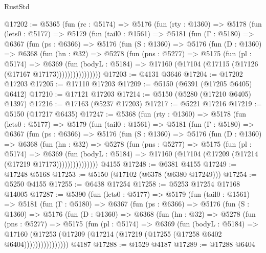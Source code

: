 \begin{lexlean}{RustStd}
\begin{coremodule}
@17202 := @5365
    (fun (rc : @5174) =>
    @5176
      (fun (rty : @1360) =>
      @5178
        (fun (lets0 : @5177) =>
        @5179
          (fun (tail0 : @1561) =>
          @5181
            (fun (Γ : @5180) =>
            @6367
              (fun (ps : @6366) =>
              @5176
                (fun (S : @1360) =>
                @5176
                  (fun (D : @1360) =>
                  @6368
                    (fun (hn : @32) =>
                    @5278
                      (fun (pns : @5277) =>
                      @5175
                        (fun (pl : @5174) =>
                        @6369
                          (fun (bodyL : @5184) =>
                          @17160 (@17104 (@17115 (@17126 (@17167 @17173))))))))))))))))
@17203 := @4131 @3646
@17204 := @17202 @17203
@17205 := @17110 @17203
@17209 := @5150 (@6391 (@17205 @6405) @6412)
@17210 := @17121 @17203
@17214 := @5150 (@5280 (@17210 @6405) @1397)
@17216 := @17163 (@5237 @17203)
@17217 := @5221 @17216
@17219 := @5150 (@17217 @6435)
@17247 := @5368
    (fun (rty : @1360) =>
    @5178
      (fun (lets0 : @5177) =>
      @5179
        (fun (tail0 : @1561) =>
        @5181
          (fun (Γ : @5180) =>
          @6367
            (fun (ps : @6366) =>
            @5176
              (fun (S : @1360) =>
              @5176
                (fun (D : @1360) =>
                @6368
                  (fun (hn : @32) =>
                  @5278
                    (fun (pns : @5277) =>
                    @5175
                      (fun (pl : @5174) =>
                      @6369
                        (fun (bodyL : @5184) =>
                        @17160 (@17104 (@17209 (@17214 (@17219 @17173)))))))))))))))
    @4155
@17248 := @6381 @4155
@17249 := @17248 @5168
@17253 := @5150 (@17102 (@6378 (@6380 @17249)))
@17254 := @5250 @4155
@17255 := @6438 @17254
@17258 := @5253 @17254 @17168 @14005
@17287 := @5390
    (fun (lets0 : @5177) =>
    @5179
      (fun (tail0 : @1561) =>
      @5181
        (fun (Γ : @5180) =>
        @6367
          (fun (ps : @6366) =>
          @5176
            (fun (S : @1360) =>
            @5176
              (fun (D : @1360) =>
              @6368
                (fun (hn : @32) =>
                @5278
                  (fun (pns : @5277) =>
                  @5175
                    (fun (pl : @5174) =>
                    @6369
                      (fun (bodyL : @5184) =>
                      @17160
                        (@17253 (@17209 (@17214 (@17219 (@17255 (@17258 @6402 @6404))))))))))))))))
    @4187
@17288 := @1529 @4187
@17289 := @17288 @6404

\end{coremodule}
\end{lexlean}

